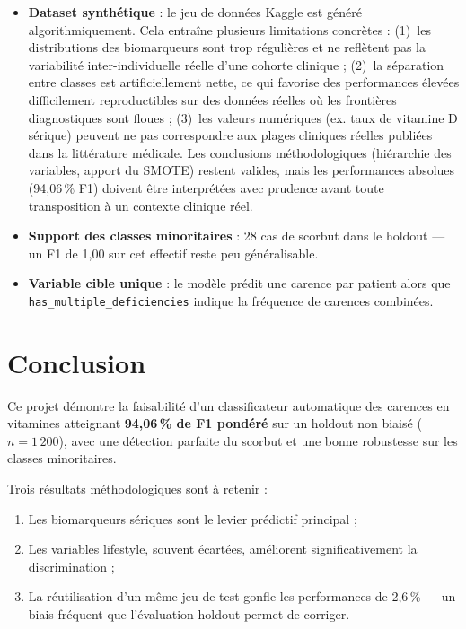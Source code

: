 \documentclass[12pt,a4paper]{article}
\begin{document}
\begin{itemize}[leftmargin=2em]
    \item \textbf{Dataset synthétique} : le jeu de données Kaggle est généré
        algorithmiquement. Cela entraîne plusieurs limitations concrètes :
        (1)~les distributions des biomarqueurs sont trop régulières et ne
        reflètent pas la variabilité inter-individuelle réelle d'une cohorte
        clinique ; (2)~la séparation entre classes est artificiellement nette,
        ce qui favorise des performances élevées difficilement reproductibles
        sur des données réelles où les frontières diagnostiques sont floues ;
        (3)~les valeurs numériques (ex. taux de vitamine D sérique) peuvent ne
        pas correspondre aux plages cliniques réelles publiées dans la
        littérature médicale. Les conclusions méthodologiques (hiérarchie des
        variables, apport du SMOTE) restent valides, mais les performances
        absolues (94,06\,\% F1) doivent être interprétées avec prudence avant
        toute transposition à un contexte clinique réel.
    \item \textbf{Support des classes minoritaires} : 28 cas de scorbut dans le
        holdout --- un F1 de 1,00 sur cet effectif reste peu généralisable.
    \item \textbf{Variable cible unique} : le modèle prédit une carence par patient
        alors que \texttt{has\_multiple\_deficiencies} indique la fréquence de
        carences combinées.
\end{itemize}

\section{Conclusion}

Ce projet démontre la faisabilité d'un classificateur automatique des carences
en vitamines atteignant \textbf{94,06\,\% de F1 pondéré} sur un holdout non biaisé
($n = 1\,200$), avec une détection parfaite du scorbut et une bonne robustesse sur
les classes minoritaires.

Trois résultats méthodologiques sont à retenir :
\begin{enumerate}[leftmargin=2em]
    \item Les biomarqueurs sériques sont le levier prédictif principal ;
    \item Les variables lifestyle, souvent écartées, améliorent significativement
        la discrimination ;
    \item La réutilisation d'un même jeu de test gonfle les performances de 2,6\,\%
        --- un biais fréquent que l'évaluation holdout permet de corriger.
\end{enumerate}
\end{document}
